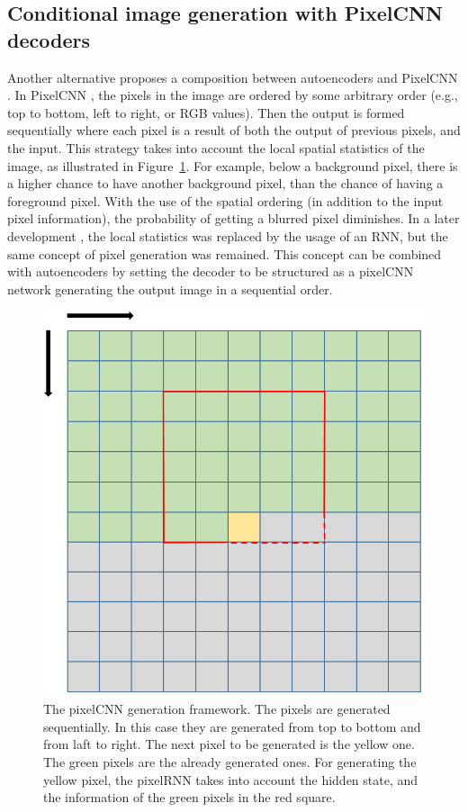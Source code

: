 \documentclass[graybox]{svmult}
\begin{document}
\subsection{Conditional image generation with PixelCNN decoders}
Another alternative proposes a composition between autoencoders and PixelCNN \cite{pixel_VAE}.
In PixelCNN \cite{pixelCNN}, the pixels in the image are ordered by some arbitrary order (e.g., top to bottom, left to right, or RGB values).
Then the output is formed sequentially where each pixel is a result of both the output of previous pixels, and the input. This strategy takes into account the local spatial statistics of the image, as illustrated in Figure~\ref{fig:pixelCNN}. For example, below a background pixel, there is a higher chance to have another background pixel, than the chance of having a foreground pixel. With the use of the spatial ordering (in addition to the input pixel information), the probability of getting a blurred pixel diminishes. In a later development \cite{pixelRNN}, the local statistics was replaced by the usage of an RNN, but the same concept of pixel generation was remained. This concept can be combined with autoencoders by setting the decoder to be structured as a pixelCNN network generating the output image in a sequential order.

\begin{figure}
    \centering
    \includegraphics[scale=0.35]{pixelCAE.PNG}
    \caption{The pixelCNN generation framework. The pixels are generated sequentially. In this case they are generated from top to bottom and from laft to right. The next pixel to be generated is the yellow one. The green pixels are the already generated ones. For generating the yellow pixel, the pixelRNN takes into account the hidden state, and the information of the green pixels in the red square. }
    \label{fig:pixelCNN}
\end{figure}
\end{document}

